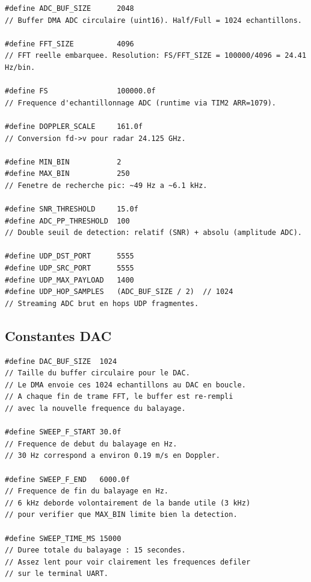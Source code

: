 \documentclass[a4paper,11pt]{article}
\begin{document}
\begin{lstlisting}[style=cstyle,caption={D\'efinitions des constantes de production (align\'ees avec main.c)}]
#define ADC_BUF_SIZE      2048
// Buffer DMA ADC circulaire (uint16). Half/Full = 1024 echantillons.

#define FFT_SIZE          4096
// FFT reelle embarquee. Resolution: FS/FFT_SIZE = 100000/4096 = 24.41 Hz/bin.

#define FS                100000.0f
// Frequence d'echantillonnage ADC (runtime via TIM2 ARR=1079).

#define DOPPLER_SCALE     161.0f
// Conversion fd->v pour radar 24.125 GHz.

#define MIN_BIN           2
#define MAX_BIN           250
// Fenetre de recherche pic: ~49 Hz a ~6.1 kHz.

#define SNR_THRESHOLD     15.0f
#define ADC_PP_THRESHOLD  100
// Double seuil de detection: relatif (SNR) + absolu (amplitude ADC).

#define UDP_DST_PORT      5555
#define UDP_SRC_PORT      5555
#define UDP_MAX_PAYLOAD   1400
#define UDP_HOP_SAMPLES   (ADC_BUF_SIZE / 2)  // 1024
// Streaming ADC brut en hops UDP fragmentes.
\end{lstlisting}

\subsection{Constantes DAC}

\begin{lstlisting}[style=cstyle,caption={Constantes du g\'en\'erateur de balayage DAC}]
#define DAC_BUF_SIZE  1024
// Taille du buffer circulaire pour le DAC.
// Le DMA envoie ces 1024 echantillons au DAC en boucle.
// A chaque fin de trame FFT, le buffer est re-rempli
// avec la nouvelle frequence du balayage.

#define SWEEP_F_START 30.0f
// Frequence de debut du balayage en Hz.
// 30 Hz correspond a environ 0.19 m/s en Doppler.

#define SWEEP_F_END   6000.0f
// Frequence de fin du balayage en Hz.
// 6 kHz deborde volontairement de la bande utile (3 kHz)
// pour verifier que MAX_BIN limite bien la detection.

#define SWEEP_TIME_MS 15000
// Duree totale du balayage : 15 secondes.
// Assez lent pour voir clairement les frequences defiler
// sur le terminal UART.
\end{lstlisting}

\newpage
\end{document}
